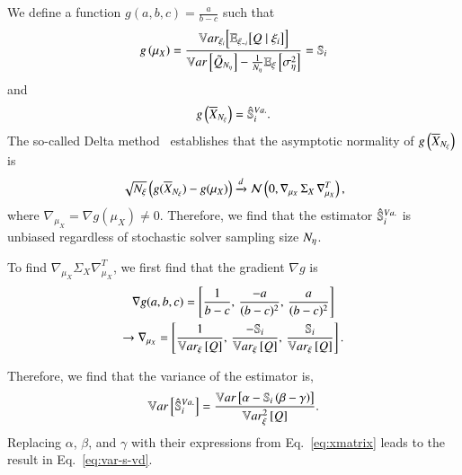 \noindent
We define a function $g(a,b,c)= \frac{a}{b - c}$ such that 
\begin{equation}
    g \left( \mu_X \right) = \frac{\mathbb{V}ar_{\xi_{i}} \Bigl[ \mathbb{E}_{\xi_{\sim i}}\bigl[ Q\mid\xi_i \bigr] \Bigr]}{\mathbb{V}ar\left[\tilde{Q}_{{N_\eta}}\right] - \frac{1}{{N_\eta}}\mathbb{E}_\xi\left[\sigma^2_\eta\right]} = \mathbb{S}_{i} 
\end{equation} and
\begin{equation}
    g \left( \overline{X}_{{N_\xi}} \right) = \hat{\mathbb{S}}_{i}^{Va.} .
\end{equation}
The so-called Delta method~\cite{vandervaart-2000} establishes that the asymptotic normality of $g \left( \overline{X}_{{N_\xi}} \right)$ is
\begin{equation*}
    \sqrt{{N_\xi}} \left( g(\overline{X}_{{N_\xi}}) - g(\mu_X) \right) \xrightarrow{d} \mathcal{N} \left( 0, \nabla_{\mu_X} \, \Sigma_X \, \nabla_{\mu_X}^T \right) ,
\end{equation*}
where $\nabla_{\mu_X} = \nabla g (\mu_X) \neq 0$.
Therefore, we find that the estimator $\hat{\mathbb{S}}_{i}^{Va.}$ is unbiased regardless of stochastic solver sampling size ${N_\eta}$.

To find $\nabla_{\mu_X} \Sigma_X \nabla_{\mu_X}^T$, we first find that the gradient $\nabla g$ is
\begin{gather}
    \nabla g (a,b,c) = \left[ \frac{1}{b-c}, \, \frac{-a}{(b-c)^2}, \, \frac{a}{(b-c)^2} \right] \\
    \rightarrow \nabla_{\mu_X} = \left[ \frac{1}{\mathbb{V}ar_{\xi}\left[Q\right]} ,\, \frac{- \mathbb{S}_{i}}{\mathbb{V}ar_{\xi}\left[Q\right]} ,\, \frac{\mathbb{S}_{i}}{\mathbb{V}ar_{\xi}\left[Q\right]} \right] .
\end{gather}

Therefore, we find that the variance of the estimator is,
\begin{equation}
    \mathbb{V}ar\left[\hat{\mathbb{S}}_{i}^{Va.}\right] = \frac{\mathbb{V}ar\left[\alpha - \mathbb{S}_{i} \left( \beta - \gamma \right)\right]}{\mathbb{V}ar^2_{\xi}\left[Q\right]} .
\end{equation}
Replacing $\alpha$, $\beta$, and $\gamma$ with their expressions from Eq.~\eqref{eq:xmatrix} leads to the result in Eq.~\ref{eq:var-s-vd}.


